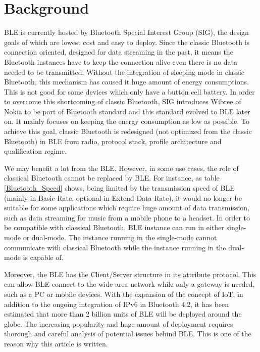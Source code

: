 \documentclass{cseminar}
\begin{document}

\section{Background}
BLE is currently hosted by Bluetooth Special Interest Group (SIG), the design goals of which are lowest cost and easy to deploy. Since the classic Bluetooth is connection oriented, designed for data streaming in the past, it means the Bluetooth instances have to keep the connection alive even there is no data needed to be transmitted. Without the integration of sleeping mode in classic Bluetooth, this mechanism has caused it huge amount of energy consumptions. This is not good for some devices which only have  a button cell battery. In order to overcome this shortcoming of classic Bluetooth, SIG introduces Wibree of Nokia to be part of Bluetooth standard and this standard evolved to BLE later on. It mainly focuses on keeping the energy consumption as low as possible. To achieve this goal, classic Bluetooth is redesigned (not optimized from the classic Bluetooth) in BLE from radio, protocol stack, profile architecture and qualification regime\cite{BLE02}.

We may benefit a lot from the BLE. However, in some use cases, the role of classical Bluetooth cannot be replaced by BLE. For instance, as table \ref{Bluetooth_Speed} shows, being limited by the transmission speed of BLE (mainly in Basic Rate, optional in Extend Data Rate), it would no longer be suitable for some applications which require huge amount of data transmission, such as data streaming for music from a mobile phone to a headset. In order to be compatible with classical Bluetooth, BLE instance can run in either single-mode or dual-mode. The instance running in the single-mode cannot communicate with classical Bluetooth while the instance running in the dual-mode is capable of.

Moreover, the BLE has the Client/Server structure in its attribute protocol. This can allow BLE connect to the wide area network while only a gateway is needed, such as a PC or mobile devices. With the expansion of the concept of IoT, in addition to the ongoing integration of IPv6 in Bluetooth 4.2, it has been estimated that more than 2 billion units of BLE will be deployed around the globe\cite{BLE01}. The increasing popularity and huge amount of deployment\cite{BLE04} requires thorough and careful analysis of potential issues behind BLE. This is one of the reason why this article is written.
\end{document}
